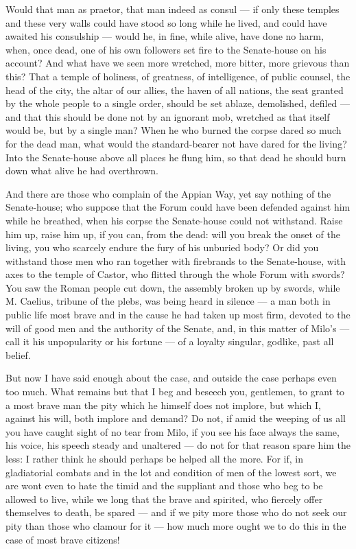  Would that man as praetor, that man indeed as consul --- if only these temples and these very walls could have stood so long while he lived, and could have awaited his consulship --- would he, in fine, while alive, have done no harm, when, once dead, one of his own followers set fire to the Senate-house on his account? And what have we seen more wretched, more bitter, more grievous than this? That a temple of holiness, of greatness, of intelligence, of public counsel, the head of the city, the altar of our allies, the haven of all nations, the seat granted by the whole people to a single order, should be set ablaze, demolished, defiled --- and that this should be done not by an ignorant mob, wretched as that itself would be, but by a single man? When he who burned the corpse dared so much for the dead man, what would the standard-bearer not have dared for the living? Into the Senate-house above all places he flung him, so that dead he should burn down what alive he had overthrown.

 And there are those who complain of the Appian Way, yet say nothing of the Senate-house; who suppose that the Forum could have been defended against him while he breathed, when his corpse the Senate-house could not withstand. Raise him up, raise him up, if you can, from the dead: will you break the onset of the living, you who scarcely endure the fury of his unburied body? Or did you withstand those men who ran together with firebrands to the Senate-house, with axes to the temple of Castor, who flitted through the whole Forum with swords? You saw the Roman people cut down, the assembly broken up by swords, while M. Caelius, tribune of the plebs, was being heard in silence --- a man both in public life most brave and in the cause he had taken up most firm, devoted to the will of good men and the authority of the Senate, and, in this matter of Milo's --- call it his unpopularity or his fortune --- of a loyalty singular, godlike, past all belief.

 But now I have said enough about the case, and outside the case perhaps even too much. What remains but that I beg and beseech you, gentlemen, to grant to a most brave man the pity which he himself does not implore, but which I, against his will, both implore and demand? Do not, if amid the weeping of us all you have caught sight of no tear from Milo, if you see his face always the same, his voice, his speech steady and unaltered --- do not for that reason spare him the less: I rather think he should perhaps be helped all the more. For if, in gladiatorial combats and in the lot and condition of men of the lowest sort, we are wont even to hate the timid and the suppliant and those who beg to be allowed to live, while we long that the brave and spirited, who fiercely offer themselves to death, be spared --- and if we pity more those who do not seek our pity than those who clamour for it --- how much more ought we to do this in the case of most brave citizens!

